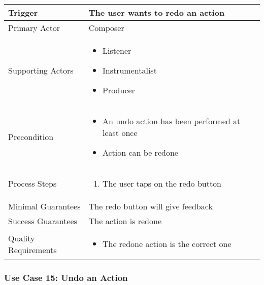 \begin{tabularx}{\textwidth}{|X|X|}
\hline
Trigger & 
The user wants to redo an action\\
\hline
Primary Actor & 
Composer \\
\hline
Supporting Actors & 
\begin{itemize}
\item Listener
\item Instrumentalist
\item Producer
\end{itemize} \\
\hline
Precondition & 
\begin{itemize}
\item An undo action has been performed at least once
\item Action can be redone
\end{itemize} \\
\hline
Process Steps & 
\begin{enumerate}
\item The user taps on the redo button
\end{enumerate} \\
\hline
Minimal Guarantees & 
The redo button will give feedback \\
\hline
Success Guarantees & 
The action is redone\\
\hline
Quality Requirements & 
\begin{itemize}
\item The redone action is the correct one 
\end{itemize} \\ 
\hline
\end{tabularx}

\subsubsection{Use Case 15: Undo an Action}

